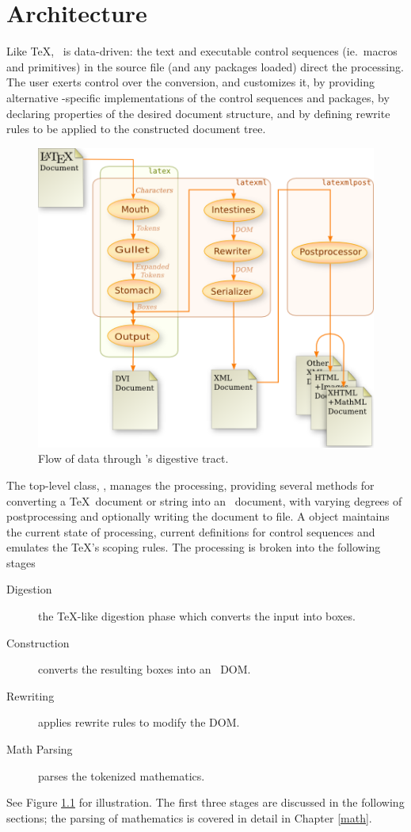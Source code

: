 \documentclass{book}
\begin{document}
\chapter{Architecture}\label{architecture}
Like \TeX, \LaTeXML\ is data-driven: the text and executable control
sequences (ie.~macros and primitives)
in the source file (and any packages loaded) direct the processing.
The user exerts control over the conversion, and customizes it, by 
providing alternative \LaTeXML-specific implementations of the control sequences and packages,
by declaring properties of the desired document structure,
and by defining rewrite rules to be applied to the constructed document tree.

\begin{figure}[tb]
\begin{center}
\includegraphics{figures/digestion}
\end{center}
\caption{Flow of data through \LaTeXML's digestive tract.\label{fig:dataflow}}
\end{figure}
The top-level class, , manages the processing, providing several methods
for converting a \TeX\ document or string into an \XML\ document, with varying degrees
of postprocessing and optionally writing the document to file.
A  object maintains the current state
of processing, current definitions for control sequences and emulates the
\TeX's scoping rules.
The processing is broken into the following stages
\begin{description}
 \item[Digestion] the \TeX-like digestion phase which converts the input into boxes.
 \item[Construction] converts the resulting boxes into an \XML\ DOM.
 \item[Rewriting] applies rewrite rules to modify the DOM.
 \item[Math Parsing] parses the tokenized mathematics.
\end{description}
See Figure \ref{fig:dataflow} for illustration.
The first three stages are discussed in the following sections;
the parsing of mathematics is covered in detail in Chapter \ref{math}.
\end{document}
